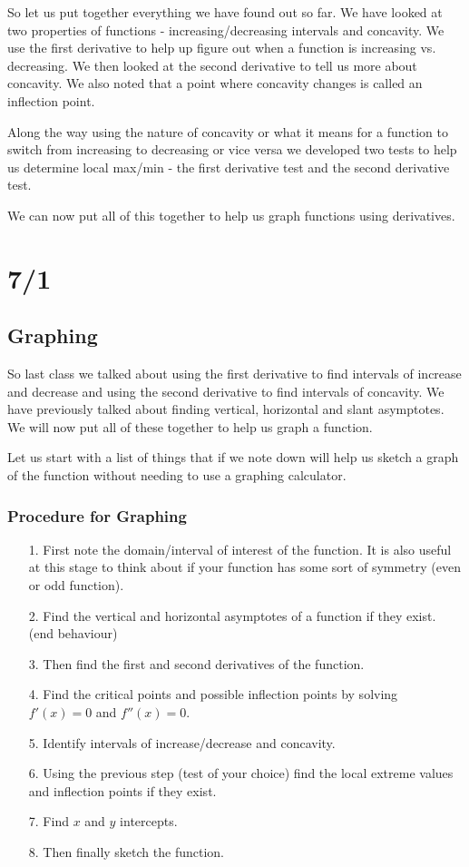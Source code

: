 \documentclass[12pt,reqno]{article}
\theoremstyle{definition}
\begin{document}
So let us put together everything we have found out so far. We have looked at two properties of functions - increasing/decreasing intervals and concavity. We use the first derivative to help up figure out when a function is increasing vs. decreasing. We then looked at the second derivative to tell us more about concavity. We also noted that a point where concavity changes is called an inflection point. 

Along the way using the nature of concavity or what it means for a function to switch from increasing to decreasing or vice versa we developed two tests to help us determine local max/min - the first derivative test and the second derivative test.

We can now put all of this together to help us graph functions using derivatives. 


\section{7/1}

\subsection{Graphing}
So last class we talked about using the first derivative to find intervals of increase and decrease and using the second derivative to find intervals of concavity. We have previously talked about finding vertical, horizontal and slant asymptotes. We will now put all of these together to help us graph a function. 

Let us start with a list of things that if we note down will help us sketch a graph of the function without needing to use a graphing calculator. 

\subsubsection{Procedure for Graphing}
\begin{itemize}
	\item[1.] First note the domain/interval of interest of the function. It is also useful at this stage to think about if your function has some sort of symmetry (even or odd function). 
	\item[2.] Find the vertical and horizontal asymptotes of a function if they exist. (end behaviour)
	\item[3.] Then find the first and second derivatives of the function. 
	\item[4.] Find the critical points and possible inflection points by solving $f'(x) = 0$ and $f''(x) = 0$. 
	\item[5.] Identify intervals of increase/decrease and concavity. 
	\item[6.] Using the previous step (test of your choice) find the local extreme values and inflection points if they exist. 
	\item[7.] Find $x$ and $y$ intercepts. 
	\item[8.] Then finally sketch the function. 
\end{itemize}
\end{document}
